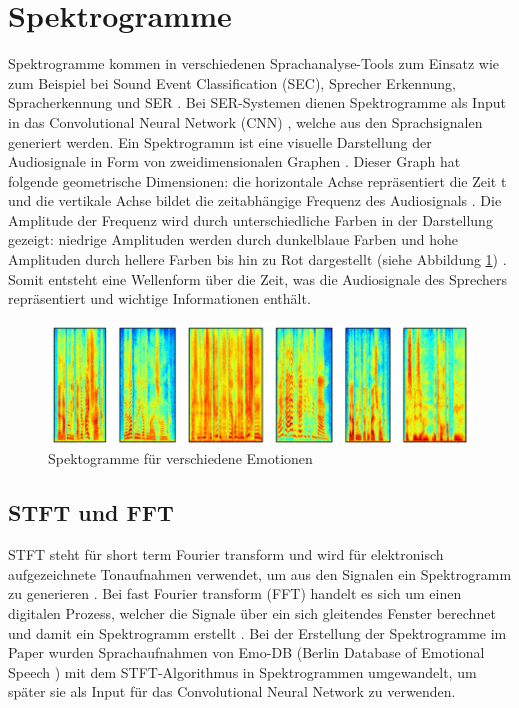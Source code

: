 \section{Spektrogramme}
Spektrogramme kommen in verschiedenen Sprachanalyse-Tools zum Einsatz wie zum Beispiel bei Sound Event Classification (SEC), Sprecher Erkennung, Spracherkennung und SER \cite{spectrogram}.
Bei SER-Systemen dienen Spektrogramme als Input in das Convolutional Neural Network (CNN) \cite{cnn}, welche aus den Sprachsignalen generiert werden. 
Ein Spektrogramm ist eine visuelle Darstellung der Audiosignale in Form von zweidimensionalen Graphen \cite{spectrogram}. Dieser Graph hat folgende geometrische Dimensionen: die horizontale Achse repräsentiert die Zeit t und die vertikale Achse bildet die zeitabhängige Frequenz des Audiosignals \cite{badshah2019deep}. Die Amplitude der Frequenz wird durch unterschiedliche Farben in der Darstellung gezeigt: niedrige Amplituden werden durch dunkelblaue Farben und hohe Amplituden durch hellere Farben bis hin zu Rot dargestellt (siehe Abbildung \ref{spektogram}) \cite{spectrogram}. Somit entsteht eine Wellenform über die Zeit, was die Audiosignale des Sprechers repräsentiert und wichtige Informationen enthält. 
\begin{figure}[ht]
	\centering
	\includegraphics[width=1\textwidth]{images/spekto.PNG}
	\caption{\label{spektogram}Spektogramme für verschiedene Emotionen \cite{badshah2019deep}}
\end{figure}
\subsection{STFT und FFT}
STFT steht für short term Fourier transform und wird für elektronisch aufgezeichnete Tonaufnahmen verwendet, um aus den Signalen ein Spektrogramm zu generieren \cite{badshah2019deep}. Bei fast Fourier transform (FFT) handelt es sich um einen digitalen Prozess, welcher die Signale über ein sich gleitendes Fenster berechnet und damit ein Spektrogramm erstellt \cite{badshah2019deep}. Bei der Erstellung der Spektrogramme im Paper \cite{badshah2019deep} wurden Sprachaufnahmen von Emo-DB (Berlin Database of Emotional Speech \cite{burkhardt2005database}) mit dem STFT-Algorithmus in Spektrogrammen umgewandelt, um später sie als Input für das Convolutional Neural Network zu verwenden.

